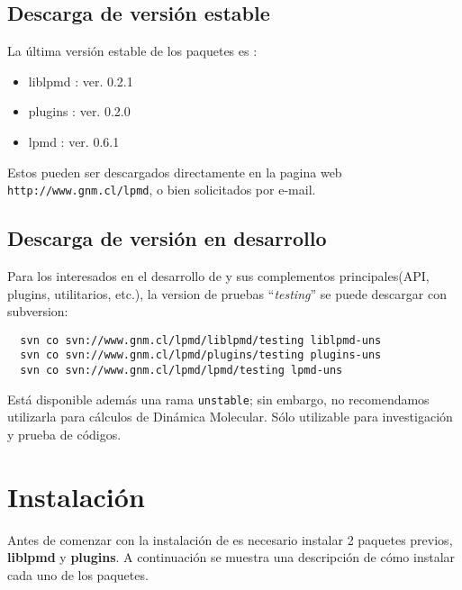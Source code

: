 \subsection{Descarga de versi\'on estable}

La \'ultima versi\'on estable de los paquetes es :

\begin{itemize}
 \item liblpmd : ver. 0.2.1
 \item plugins : ver. 0.2.0
 \item lpmd    : ver. 0.6.1
\end{itemize}


Estos pueden ser descargados directamente en la pagina web \texttt{http://www.gnm.cl/lpmd}, o bien solicitados por e-mail.

\subsection{Descarga de versi\'on en desarrollo}

Para los interesados en el desarrollo de {\lpmd} y sus complementos principales(API, plugins, utilitarios, etc.), la version de pruebas ``\textit{testing}'' se puede descargar con subversion:

\begin{center}
 \begin{verbatim}
  svn co svn://www.gnm.cl/lpmd/liblpmd/testing liblpmd-uns
  svn co svn://www.gnm.cl/lpmd/plugins/testing plugins-uns
  svn co svn://www.gnm.cl/lpmd/lpmd/testing lpmd-uns
 \end{verbatim}
\end{center}

Est\'a disponible adem\'as una rama \verb|unstable|; sin embargo, no recomendamos utilizarla para c\'alculos de Din\'amica Molecular. S\'olo utilizable para investigaci\'on y prueba de c\'odigos.

\section{Instalaci\'on}
Antes de comenzar con la instalaci\'on de {\lpmd} es necesario instalar 2 paquetes previos, \textbf{liblpmd} y \textbf{plugins}. A continuaci\'on se muestra una descripci\'on de c\'omo instalar cada uno de los paquetes.\\

